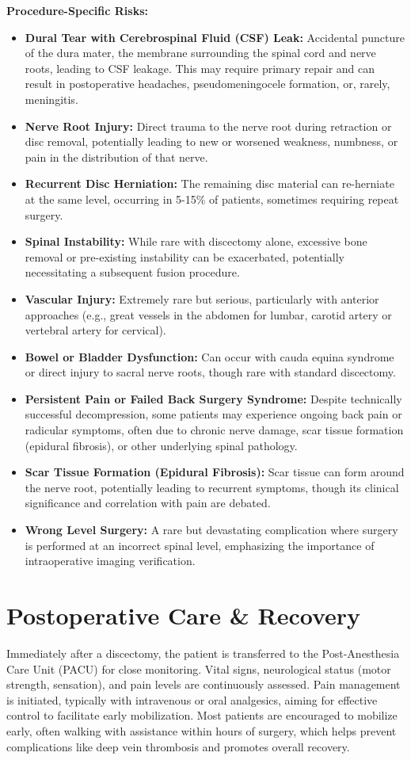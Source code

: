 \textbf{Procedure-Specific Risks:}
\begin{itemize}
  \item \textbf{Dural Tear with Cerebrospinal Fluid (CSF) Leak:} Accidental puncture of the dura mater, the membrane surrounding the spinal cord and nerve roots, leading to CSF leakage. This may require primary repair and can result in postoperative headaches, pseudomeningocele formation, or, rarely, meningitis.
  \item \textbf{Nerve Root Injury:} Direct trauma to the nerve root during retraction or disc removal, potentially leading to new or worsened weakness, numbness, or pain in the distribution of that nerve.
  \item \textbf{Recurrent Disc Herniation:} The remaining disc material can re-herniate at the same level, occurring in 5-15\% of patients, sometimes requiring repeat surgery.
  \item \textbf{Spinal Instability:} While rare with discectomy alone, excessive bone removal or pre-existing instability can be exacerbated, potentially necessitating a subsequent fusion procedure.
  \item \textbf{Vascular Injury:} Extremely rare but serious, particularly with anterior approaches (e.g., great vessels in the abdomen for lumbar, carotid artery or vertebral artery for cervical).
  \item \textbf{Bowel or Bladder Dysfunction:} Can occur with cauda equina syndrome or direct injury to sacral nerve roots, though rare with standard discectomy.
  \item \textbf{Persistent Pain or Failed Back Surgery Syndrome:} Despite technically successful decompression, some patients may experience ongoing back pain or radicular symptoms, often due to chronic nerve damage, scar tissue formation (epidural fibrosis), or other underlying spinal pathology.
  \item \textbf{Scar Tissue Formation (Epidural Fibrosis):} Scar tissue can form around the nerve root, potentially leading to recurrent symptoms, though its clinical significance and correlation with pain are debated.
  \item \textbf{Wrong Level Surgery:} A rare but devastating complication where surgery is performed at an incorrect spinal level, emphasizing the importance of intraoperative imaging verification.
\end{itemize}

\section*{Postoperative Care \& Recovery}
Immediately after a discectomy, the patient is transferred to the Post-Anesthesia Care Unit (PACU) for close monitoring. Vital signs, neurological status (motor strength, sensation), and pain levels are continuously assessed. Pain management is initiated, typically with intravenous or oral analgesics, aiming for effective control to facilitate early mobilization. Most patients are encouraged to mobilize early, often walking with assistance within hours of surgery, which helps prevent complications like deep vein thrombosis and promotes overall recovery.

